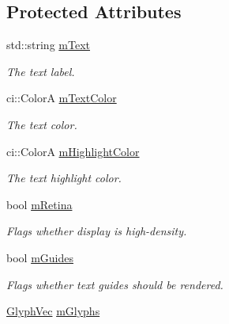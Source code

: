 \subsection*{Protected Attributes}
\begin{DoxyCompactItemize}
\item 
\hypertarget{class_ui_text_af9baf9339efe5584cdc23da1a7990a8f}{std\-::string \hyperlink{class_ui_text_af9baf9339efe5584cdc23da1a7990a8f}{m\-Text}}\label{class_ui_text_af9baf9339efe5584cdc23da1a7990a8f}

\begin{DoxyCompactList}\small\item\em The text label. \end{DoxyCompactList}\item 
\hypertarget{class_ui_text_ae35a598b285b9df3741221cc1c15c213}{ci\-::\-Color\-A \hyperlink{class_ui_text_ae35a598b285b9df3741221cc1c15c213}{m\-Text\-Color}}\label{class_ui_text_ae35a598b285b9df3741221cc1c15c213}

\begin{DoxyCompactList}\small\item\em The text color. \end{DoxyCompactList}\item 
\hypertarget{class_ui_text_a3e7712d38dd468a39b3294a03daf5882}{ci\-::\-Color\-A \hyperlink{class_ui_text_a3e7712d38dd468a39b3294a03daf5882}{m\-Highlight\-Color}}\label{class_ui_text_a3e7712d38dd468a39b3294a03daf5882}

\begin{DoxyCompactList}\small\item\em The text highlight color. \end{DoxyCompactList}\item 
\hypertarget{class_ui_text_aa1e3126a2becffdb2da9d20fc1998514}{bool \hyperlink{class_ui_text_aa1e3126a2becffdb2da9d20fc1998514}{m\-Retina}}\label{class_ui_text_aa1e3126a2becffdb2da9d20fc1998514}

\begin{DoxyCompactList}\small\item\em Flags whether display is high-\/density. \end{DoxyCompactList}\item 
\hypertarget{class_ui_text_abbca21ae97129eac76de5ff252efaef7}{bool \hyperlink{class_ui_text_abbca21ae97129eac76de5ff252efaef7}{m\-Guides}}\label{class_ui_text_abbca21ae97129eac76de5ff252efaef7}

\begin{DoxyCompactList}\small\item\em Flags whether text guides should be rendered. \end{DoxyCompactList}\item 
\hypertarget{class_ui_text_a39cd9188c7050eef5d516efa144306b5}{\hyperlink{class_ui_text_a06c07525f3f67cc894c681006c43434e}{Glyph\-Vec} \hyperlink{class_ui_text_a39cd9188c7050eef5d516efa144306b5}{m\-Glyphs}}\label{class_ui_text_a39cd9188c7050eef5d516efa144306b5}


\end{DoxyCompactItemize}
